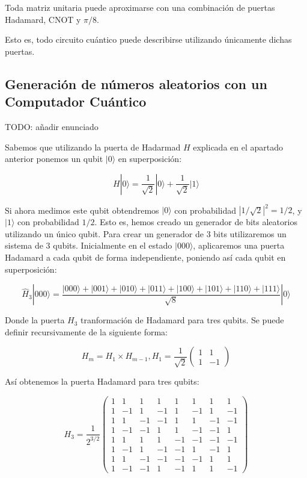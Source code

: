 \documentclass[11pt]{article}
\newcommand{\ra}{\rangle}
\newcommand{\ra}{\rangle}
\begin{document}
\begin{theorem}
	Toda matriz unitaria puede aproximarse con una combinación de puertas Hadamard, CNOT y $\pi/8$.
\end{theorem}

Esto es, todo circuito cuántico puede describirse utilizando únicamente dichas puertas.

\subsection{Generación de números aleatorios con un Computador Cuántico}

TODO: añadir enunciado

Sabemos que utilizando la puerta de Hadarmad $H$ explicada en el apartado anterior ponemos un qubit $|0\ra$ en superposición:

\[
	H|0\ra = \frac{1}{\sqrt 2} |0\ra + \frac{1}{\sqrt 2} |1\ra
\]

Si ahora medimos este qubit obtendremos $|0\ra$ con probabilidad $|1/\sqrt 2|^2 = 1/2$, y $|1\ra$ con probabilidad $1/2$. Esto es, hemos creado un generador de bits aleatorios utilizando un único qubit. Para crear un generador de 3 bits utilizaremos un sistema de 3 qubits. Inicialmente en el estado $|000\ra$, aplicaremos una puerta Hadamard a cada qubit de forma independiente, poniendo así cada qubit en superposición:

\[
	\hat H_3|000\ra = \frac{|000\ra + |001\ra + |010\ra + |011\ra + |100\ra + |101\ra + |110\ra + |111\ra}{\sqrt 8} |0\ra
\]

Donde la puerta $H_3$ tranformación de Hadamard para tres qubits. Se puede definir recursivamente de la siguiente forma:

\[
	H_m = H_1 \times H_{m-1}, H_1 = \frac{1}{\sqrt 2}
	\begin{pmatrix}
		1 & 1 \\
		1 & -1 
	\end{pmatrix}
\]

Así obtenemos la puerta Hadamard para tres qubits:

\[
	H_3 = \frac{1}{2^{3/2}}
	\begin{pmatrix}
		1 & 1 & 1 & 1 & 1 & 1 & 1 & 1 \\
		1 & -1 & 1 & -1 & 1 & -1 & 1 & -1 \\
		1 & 1 & -1 & -1 & 1 & 1 & -1 & -1 \\
		1 & -1 & -1 & 1 & 1 & -1 & -1 & 1 \\
		1 & 1 & 1 & 1 & -1 & -1 & -1 & -1 \\
		1 & -1 & 1 & -1 & -1 & 1 & -1 & 1 \\
		1 & 1 & -1 & -1 & -1 & -1 & 1 & 1 \\
		1 & -1 & -1 & 1 & -1 & 1 & 1 & -1
	\end{pmatrix}
\]
\end{document}
